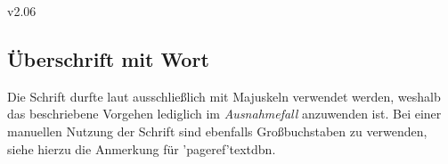 \begin{NoIndexDefault}
\begin{Cessations}{v2.06}
\begin{Example}
\begin{Code}
\chapter{Überschrift mit  Wort}
\end{Code}
\end{Example}
%
Die Schrift \DIN durfte laut \CD ausschließlich mit Majuskeln verwendet werden, 
weshalb das beschriebene Vorgehen lediglich im \emph{Ausnahmefall} anzuwenden 
ist. Bei einer manuellen Nutzung der Schrift sind ebenfalls Großbuchstaben zu 
verwenden, siehe hierzu die Anmerkung für \Macro'pageref'{textdbn}.
\end{Cessations}
%
\end{NoIndexDefault}
